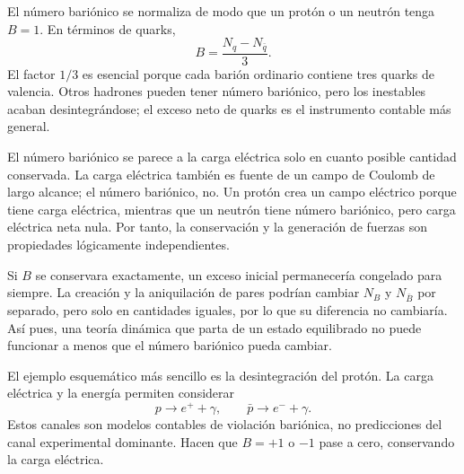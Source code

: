 El número bariónico se normaliza de modo que un protón o un neutrón tenga \(B=1\). En términos de quarks,
\begin{equation}
B=\frac{N_q-N_{\bar q}}{3}.
\label{eq:c08-baryon-number}
\end{equation}
El factor \(1/3\) es esencial porque cada barión ordinario contiene tres quarks de valencia. Otros hadrones pueden tener número bariónico, pero los inestables acaban desintegrándose; el exceso neto de quarks es el instrumento contable más general.

\begin{classroomqa}
\end{classroomqa}

El número bariónico se parece a la carga eléctrica solo en cuanto posible cantidad conservada. La carga eléctrica también es fuente de un campo de Coulomb de largo alcance; el número bariónico, no. Un protón crea un campo eléctrico porque tiene carga eléctrica, mientras que un neutrón tiene número bariónico, pero carga eléctrica neta nula. Por tanto, la conservación y la generación de fuerzas son propiedades lógicamente independientes.

\begin{classroomqa}
\end{classroomqa}

Si \(B\) se conservara exactamente, un exceso inicial permanecería congelado para siempre. La creación y la aniquilación de pares podrían cambiar \(N_B\) y \(N_{\bar B}\) por separado, pero solo en cantidades iguales, por lo que su diferencia no cambiaría. Así pues, una teoría dinámica que parta de un estado equilibrado no puede funcionar a menos que el número bariónico pueda cambiar.

El ejemplo esquemático más sencillo es la desintegración del protón. La carga eléctrica y la energía permiten considerar
\begin{equation}
p\longrightarrow e^+ +\gamma,
\qquad
\bar p\longrightarrow e^-+\gamma.
\label{eq:c08-decay-pair}
\end{equation}
Estos canales son modelos contables de violación bariónica, no predicciones del canal experimental dominante. Hacen que \(B=+1\) o \(-1\) pase a cero, conservando la carga eléctrica.

